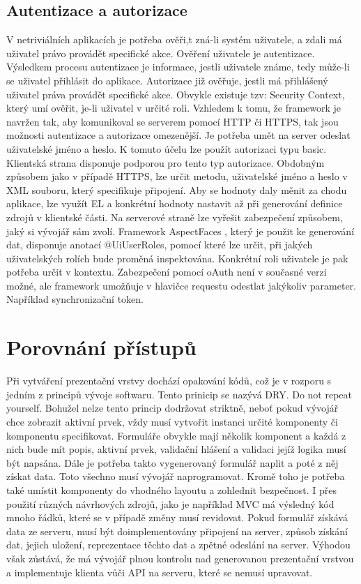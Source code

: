 \subsection{Autentizace a autorizace}
V netriviálních aplikacích je potřeba ověři,t zná-li systém uživatele, a zdali má uživatel právo provádět specifické akce. Ověření uživatele je autentizace. Výsledkem procesu autentizace je informace, jestli uživatele známe, tedy může-li se uživatel přihlásit do aplikace. Autorizace již ověřuje, jestli má přihlášený uživatel práva provádět specifické akce. Obvykle existuje tzv: Security Context, který umí ověřit, je-li uživatel v určité roli. Vzhledem k tomu, že framework je navržen tak, aby komunikoval se serverem pomocí HTTP či HTTPS, tak jsou možnosti autentizace a autorizace omezenější. Je potřeba umět na server odeslat uživatelské jméno a heslo. K tomuto účelu lze použít autorizaci typu basic. Klientská strana disponuje podporou pro tento typ autorizace. Obdobným způsobem jako v případě HTTPS, lze určit metodu, uživatelské jméno a heslo v XML souboru, který specifikuje připojení. Aby se hodnoty daly měnit za chodu aplikace, lze využít EL a konkrétní hodnoty nastavit až při generování definice zdrojů v klientské části. Na serverové straně lze vyřešit zabezpečení způsobem, jaký si vývojář sám zvolí. Framework AspectFaces \cite{aspectFaces}, který je použit ke generování dat, disponuje anotací @UiUserRoles, pomocí které lze určit, při jakých uživatelských rolích bude proměná inspektována. Konkrétní roli uživatele je pak potřeba určit v kontextu. Zabezpečení pomocí oAuth není v současné verzi možné, ale framework umožňuje v hlavičce requestu odestlat jakýkoliv parameter. Například synchronizační token. 

\section{Porovnání přístupů}
Při vytváření prezentační vrstvy dochází opakování kódů, což je v rozporu s jedním z principů vývoje softwaru. Tento prinicip se nazývá DRY. Do not repeat yourself. Bohužel nelze tento princip dodržovat striktně, neboť pokud vývojář chce zobrazit aktivní prvek, vždy musí vytvořit instanci určité komponenty či komponentu specifikovat. Formuláře obvykle mají několik komponent a každá z nich bude mít popis, aktivní prvek, validační hlášení a validaci jejíž logika musí být napsána. Dále je potřeba takto vygenerovaný formulář naplit a poté z něj získat data. Toto všechno musí vývojář naprogramovat. Kromě toho je potřeba také umístit komponenty do vhodného layoutu a zohlednit bezpečnost. I přes použití různých návrhových zdrojů, jako je například MVC \cite{fowler} má výsledný kód mnoho řádků, které se v případě změny musí revidovat. Pokud formulář získává data ze serveru, musí být doimplementovány připojení na server, způsob získání dat, jejich uložení, reprezentace těchto dat a zpětné odeslání na server. Výhodou však zůstává, že má vývojář plnou kontrolu nad generovanou prezentační vrstvou a implementuje klienta vůči API na serveru, které se nemusí upravovat.

